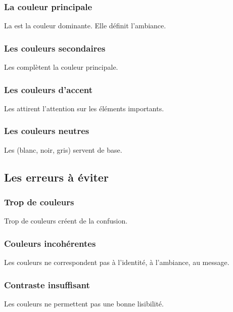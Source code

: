 \subsubsection{La couleur principale}

La  est la couleur dominante. Elle définit l'ambiance.

\subsubsection{Les couleurs secondaires}

Les  complètent la couleur principale.

\subsubsection{Les couleurs d'accent}

Les  attirent l'attention sur les éléments importants.

\subsubsection{Les couleurs neutres}

Les  (blanc, noir, gris) servent de base.

\subsection{Les erreurs à éviter}

\subsubsection{Trop de couleurs}

Trop de couleurs créent de la confusion.

\subsubsection{Couleurs incohérentes}

Les couleurs ne correspondent pas à l'identité, à l'ambiance, au message.

\subsubsection{Contraste insuffisant}

Les couleurs ne permettent pas une bonne lisibilité.

